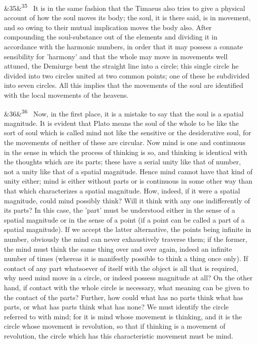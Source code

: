 \documentclass[12pt]{article}
\newcommand{\para}[1][]{\par\noindent\ifx&#1&\else\textsuperscript{\footnotesize #1}~\fi}
\begin{document}
\para[35] It is in the same fashion that the Timaeus also tries to give a physical account of how the soul moves its body; the soul, it is there said, is in movement, and so owing to their mutual implication moves the body also. After compounding the soul-substance out of the elements and dividing it in accordance with the harmonic numbers, in order that it may possess a connate sensibility for 'harmony' and that the whole may move in movements well attuned, the Demiurge bent the straight line into a circle; this single circle he divided into two circles united at two common points; one of these he subdivided into seven circles. All this implies that the movements of the soul are identified with the local movements of the heavens.

\para[36] Now, in the first place, it is a mistake to say that the soul is a spatial magnitude. It is evident that Plato means the soul of the whole to be like the sort of soul which is called mind not like the sensitive or the desiderative soul, for the movements of neither of these are circular. Now mind is one and continuous in the sense in which the process of thinking is so, and thinking is identical with the thoughts which are its parts; these have a serial unity like that of number, not a unity like that of a spatial magnitude. Hence mind cannot have that kind of unity either; mind is either without parts or is continuous in some other way than that which characterizes a spatial magnitude. How, indeed, if it were a spatial magnitude, could mind possibly think? Will it think with any one indifferently of its parts? In this case, the 'part' must be understood either in the sense of a spatial magnitude or in the sense of a point (if a point can be called a part of a spatial magnitude). If we accept the latter alternative, the points being infinite in number, obviously the mind can never exhaustively traverse them; if the former, the mind must think the same thing over and over again, indeed an infinite number of times (whereas it is manifestly possible to think a thing once only). If contact of any part whatsoever of itself with the object is all that is required, why need mind move in a circle, or indeed possess magnitude at all? On the other hand, if contact with the whole circle is necessary, what meaning can be given to the contact of the parts? Further, how could what has no parts think what has parts, or what has parts think what has none? We must identify the circle referred to with mind; for it is mind whose movement is thinking, and it is the circle whose movement is revolution, so that if thinking is a movement of revolution, the circle which has this characteristic movement must be mind.
\end{document}
